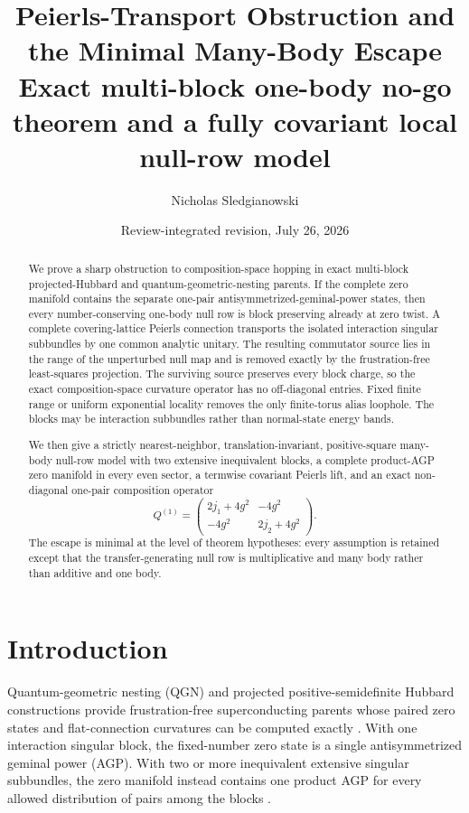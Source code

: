 \documentclass[11pt]{article}
\title{\textbf{Peierls-Transport Obstruction and the Minimal Many-Body Escape}\\[0.35em]
\large Exact multi-block one-body no-go theorem and a fully covariant local null-row model}
\author{Nicholas Sledgianowski}
\date{Review-integrated revision, July 26, 2026}
\theoremstyle{remark}
\begin{document}
\maketitle

\begin{abstract}
We prove a sharp obstruction to composition-space hopping in exact multi-block
projected-Hubbard and quantum-geometric-nesting parents.  If the complete zero
manifold contains the separate one-pair antisymmetrized-geminal-power states,
then every number-conserving one-body null row is block preserving already at
zero twist.  A complete covering-lattice Peierls connection transports the
isolated interaction singular subbundles by one common analytic unitary.  The
resulting commutator source lies in the range of the unperturbed null map and
is removed exactly by the frustration-free least-squares projection.  The
surviving source preserves every block charge, so the exact composition-space
curvature operator has no off-diagonal entries.  Fixed finite range or uniform
exponential locality removes the only finite-torus alias loophole.  The blocks
may be interaction subbundles rather than normal-state energy bands.

We then give a strictly nearest-neighbor, translation-invariant, positive-square
many-body null-row model with two extensive inequivalent blocks, a complete
product-AGP zero manifold in every even sector, a termwise covariant Peierls
lift, and an exact non-diagonal one-pair composition operator
\[
 Q^{(1)}=
 \begin{pmatrix}
 2j_1+4g^2&-4g^2\\
 -4g^2&2j_2+4g^2
 \end{pmatrix}.
\]
The escape is minimal at the level of theorem hypotheses: every assumption is
retained except that the transfer-generating null row is multiplicative and
many body rather than additive and one body.
\end{abstract}

\section{Introduction}

Quantum-geometric nesting (QGN) and projected positive-semidefinite Hubbard
constructions provide frustration-free superconducting parents whose paired
zero states and flat-connection curvatures can be computed exactly
\cite{Parent2026}.  With one interaction singular block, the fixed-number
zero state is a single antisymmetrized geminal power (AGP).  With two or more
inequivalent extensive singular subbundles, the zero manifold instead contains
one product AGP for every allowed distribution of pairs among the blocks
\cite{Addendum2026}.
\end{document}
